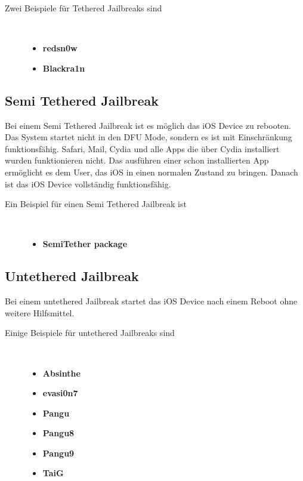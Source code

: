 \begin{description}
\item[Zwei Beispiele für \glqq Tethered Jailbreaks\grqq{} sind]~\par
	\begin{itemize}
        \item \textbf{redsn0w}
        \item \textbf{Blackra1n}
    \end{itemize}
\end{description} 

\subsection{Semi Tethered Jailbreak}
\label{sec:JBSemiTethered}

Bei einem \glqq Semi Tethered Jailbreak\grqq{} ist es möglich das iOS Device
zu rebooten. Das System startet nicht in den DFU Mode, sondern es ist
mit Einschränkung funktionsfähig. Safari, Mail, Cydia und alle Apps die über
Cydia installiert wurden funktionieren nicht. Das ausführen einer schon
installierten App ermöglicht es dem User, das iOS in einen normalen Zustand zu
bringen. Danach ist das iOS Device vollständig funktionsfähig.

\begin{description}
\item[Ein Beispiel für einen \glqq Semi Tethered Jailbreak\grqq{} ist]~\par
	\begin{itemize}
        \item \textbf{SemiTether package}
    \end{itemize}
\end{description} 

\subsection{Untethered Jailbreak}
\label{sec:JBUntethered}

Bei einem \glqq untethered Jailbreak\grqq{} startet das iOS Device nach einem
Reboot ohne weitere Hilfsmittel.  
\begin{description}
\item[Einige Beispiele für \glqq untethered Jailbreaks\grqq{} sind]~\par
	\begin{multicols}{2}
	\begin{itemize}
        \item \textbf{Absinthe}
        \item \textbf{evasi0n7}
        \item \textbf{Pangu}
        \item \textbf{Pangu8}
        \item \textbf{Pangu9}
        \item \textbf{TaiG}
    \end{itemize}
    \end{multicols}
\end{description} 


